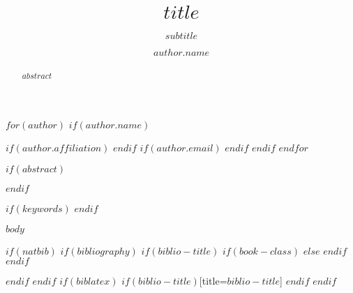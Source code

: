 \documentclass[sigplan,screen,$for(classoption)$$classoption$$sep$,$endfor$]{$documentclass$}
\title{$title$}
\subtitle{$subtitle$}
\begin{document}
$for(author)$
	$if(author.name)$
		\author{$author.name$}
		$if(author.affiliation)$
		$endif$
		$if(author.email)$
		$endif$
	$endif$
$endfor$

$if(abstract)$
\begin{abstract}
$abstract$
\end{abstract}
$endif$



$if(keywords)$
$endif$

\maketitle

$body$


\appendix

$if(natbib)$
  $if(bibliography)$
    $if(biblio-title)$
      $if(book-class)$
      \renewcommand\bibname{$biblio-title$}
      $else$
      \renewcommand\refname{$biblio-title$}
      $endif$
    $endif$
    
    $endif$
  $endif$
  $if(biblatex)$
  \printbibliography$if(biblio-title)$[title=$biblio-title$]
  $endif$
$endif$
\end{document}
